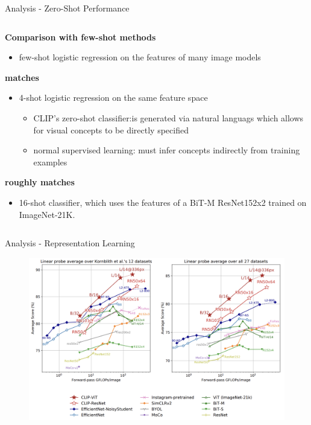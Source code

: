\documentclass[aspectratio=169,xcolor=dvipsnames]{beamer}
\begin{document}
\begin{frame}{Analysis - Zero-Shot Performance}
\begin{columns}
    \begin{column}{0.5\textwidth}
        \textbf{Comparison with few-shot methods}\\
        \begin{itemize}
            \item few-shot logistic regression on the features of many image models
        \end{itemize}
        \textbf{matches}\\
        \begin{itemize}
            \item 4-shot logistic regression on the same feature space \\
            \begin{itemize}
                \item CLIP’s zero-shot classifier:is generated via natural languags which allows for visual concepts to be directly specified
                \item normal supervised learning: must infer concepts indirectly from training examples
            \end{itemize}
        \end{itemize}
        \textbf{roughly matches}\\
        \begin{itemize}
            \item 16-shot classifier, which uses the features of a BiT-M ResNet152x2 trained on ImageNet-21K.
        \end{itemize}
\end{column}
\end{columns}
\end{frame}


\begin{frame}{Analysis - Representation Learning}
    \begin{figure}
        \centering
        \includegraphics[width=0.75 \linewidth]{figures/representation_learning_capability.png}
        \label{representation_learning_capability}
    \end{figure}    
\end{frame}
\end{document}

